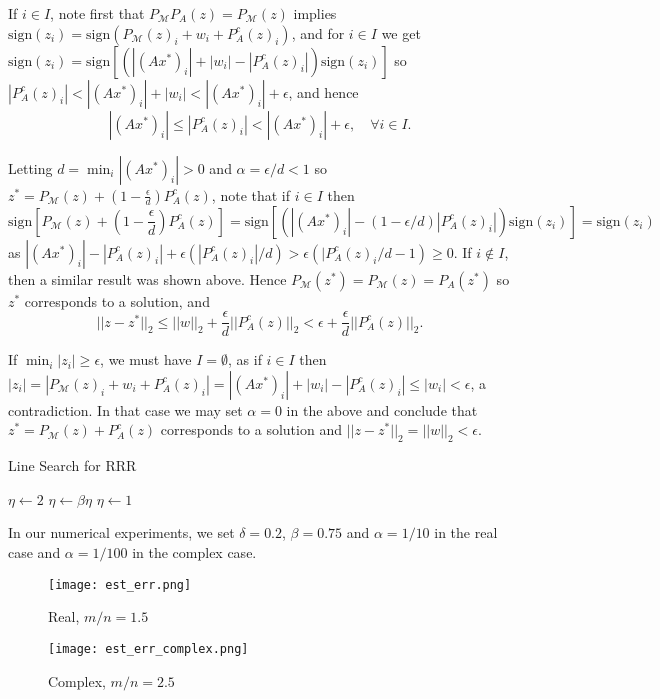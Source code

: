 \documentclass[12pt]{article}
\theoremstyle{definition}
\theoremstyle{remark}
\theoremstyle{definition}
\theoremstyle{problem}
\theoremstyle{definition}
\newcommand{\sign}{\text{sign}}
\newcommand{\MM}{\mathcal{M}}
\begin{document}
If $i\in I$, note first that $P_{\MM}P_A(z) = P_{\MM}(z)$ implies $\sign(z_i) = \sign(P_{\MM}(z)_i+w_i+P_A^c(z)_i)$, and for $i\in I$ we get $\sign(z_i) = \sign\left[(|(Ax^*)_i| + |w_i| - |P_A^c(z)_i|)\sign(z_i)\right]$ so $|P_A^c(z)_i|<|(Ax^*)_i| + |w_i|< |(Ax^*)_i| + \epsilon$, and hence
\[|(Ax^*)_i|\leq |P_A^c(z)_i|<|(Ax^*)_i| + \epsilon,\quad \forall i\in I.\]

Letting $d = \min_i|(Ax^*)_i| > 0$ and $\alpha = \epsilon/d<1$ so $z^* = P_{\MM}(z) + (1-\frac{\epsilon}{d})P_A^c(z)$, note that if $i\in I$ then
\[\sign\left[P_{\MM}(z) + (1-\frac{\epsilon}{d})P_A^c(z)\right] = \sign\left[(|(Ax^*)_i|-(1-\epsilon/d)|P_A^c(z)_i|)\sign(z_i)\right] = \sign(z_i)\]
as $|(Ax^*)_i|-|P_A^c(z)_i|+\epsilon(|P_A^c(z)_i|/d)>\epsilon\left(|P_A^c(z)_i/d - 1\right) \geq 0$. If $i\notin I$, then a similar result was shown above. Hence $P_{\MM}(z^*)=P_{\MM}(z) = P_A(z^*)$ so $z^*$ corresponds to a solution, and
\[||z-z^*||_2 \leq ||w||_2 + \frac{\epsilon}{d}||P_A^c(z)||_2 < \epsilon + \frac{\epsilon}{d}||P_A^c(z)||_2.\]

If $\min_i|z_i|\geq\epsilon$, we must have $I=\emptyset$, as if $i\in I$ then $|z_i| = |P_{\MM}(z)_i+w_i+P_A^c(z)_i|=|(Ax^*)_i| + |w_i| - |P_A^c(z)_i|\leq |w_i|<\epsilon$, a contradiction. In that case we may set $\alpha=0$ in the above and conclude that $z^* = P_{\MM}(z) + P_A^c(z)$ corresponds to a solution and $||z-z^*||_2 = ||w||_2<\epsilon$. 

\newpage
\begin{algorithm}
\caption{Line Search for RRR}\label{alg:LS_for_RRR}
\begin{algorithmic}
\INPUT{$\alpha,\beta,\delta$}
\OUTPUT{$\eta$}
\State $\eta\gets 2$ 
    \State $\eta\gets \beta\eta$
\EndWhile
\If{$\eta \leq \delta$}
    \State $\eta \gets 1$
\EndIf
\end{algorithmic}
\end{algorithm}
In our numerical experiments, we set $\delta = 0.2$, $\beta = 0.75$ and $\alpha=1/10$ in the real case and $\alpha = 1/100$ in the complex case.

\begin{figure}[!p]
    \centering
    \texttt{[image: est\_err.png]}
    \caption{Real, $m/n=1.5$}\label{fig:awesome_image1}
\end{figure}
\begin{figure}[!p]
    \centering
    \texttt{[image: est\_err\_complex.png]}
    \caption{Complex, $m/n=2.5$}\label{fig:awesome_image2}
\end{figure}
\end{document}
